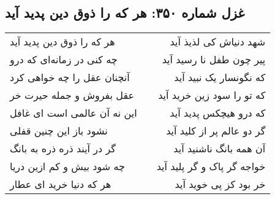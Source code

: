 \begin{center}
\section*{غزل شماره ۳۵۰: هر که را ذوق دین پدید آید}
\label{sec:350}
\begin{longtable}{l p{0.5cm} r}
هر که را ذوق دین پدید آید
&&
شهد دنیاش کی لذیذ آید
\\
چه کنی در زمانه‌ای که درو
&&
پیر چون طفل نا رسید آید
\\
آنچنان عقل را چه خواهی کرد
&&
که نگونسار یک نبید آید
\\
عقل بفروش و جمله حیرت خر
&&
که تو را سود زین خرید آید
\\
این نه آن عالمی است ای غافل
&&
که درو هیچکس پدید آید
\\
نشود باز این چنین قفلی
&&
گر دو عالم پر از کلید آید
\\
گر در آیند ذره ذره به بانگ
&&
آن همه بانگ ناشنید آید
\\
چه شود بیش و کم ازین دریا
&&
خواجه گر پاک و گر پلید آید
\\
هر که دنیا خرید ای عطار
&&
خر بود کز پی خوید آید
\\
\end{longtable}
\end{center}
